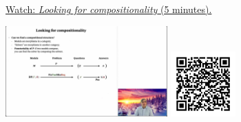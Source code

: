
\begin{minipage}{10cm}
    \href{https://act4e-spring21.netlify.app/videos/spring2021-functorial-comp-a:compositionality.html}{Watch: \emph{Looking for compositionality} (5 minutes).}
        
    \href{https://act4e-spring21.netlify.app/videos/spring2021-functorial-comp-a:compositionality.html}{\includegraphics[height=3.5cm]{spring2021-functorial-comp-a:compositionality/thumbnails.jpg}}
    \href{https://act4e-spring21.netlify.app/videos/spring2021-functorial-comp-a:compositionality.html}{\includegraphics[height=2.5cm]{spring2021-functorial-comp-a:compositionality/qrcode.png}}
\end{minipage}

